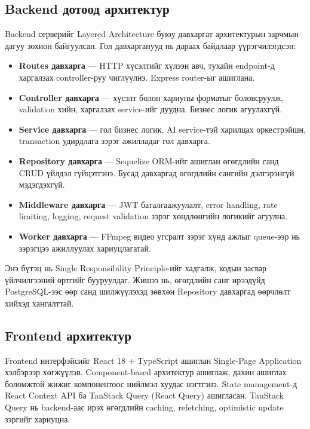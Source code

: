 \subsection{Backend дотоод архитектур}

Backend серверийг Layered Architecture буюу давхаргат архитектурын зарчмын дагуу зохион байгуулсан. Гол давхарганууд нь дараах байдлаар үүрэгчилэгдсэн:

\begin{itemize}
  \item \textbf{Routes давхарга} --- HTTP хүсэлтийг хүлээн авч, тухайн endpoint-д харгалзах controller-руу чиглүүлнэ. Express router-ыг ашиглана.
  \item \textbf{Controller давхарга} --- хүсэлт болон хариуны форматыг боловсруулж, validation хийн, харгалзах service-ийг дуудна. Бизнес логик агуулахгүй.
  \item \textbf{Service давхарга} --- гол бизнес логик, AI service-тэй харилцах оркестрэйшн, transaction удирдлага зэрэг ажилладаг гол давхарга.
  \item \textbf{Repository давхарга} --- Sequelize ORM-ийг ашиглан өгөгдлийн санд CRUD үйлдэл гүйцэтгэнэ. Бусад давхаргад өгөгдлийн сангийн дэлгэрэнгүй мэдэгдэхгүй.
  \item \textbf{Middleware давхарга} --- JWT баталгаажуулалт, error handling, rate limiting, logging, request validation зэрэг хөндлөнгийн логикийг агуулна.
  \item \textbf{Worker давхарга} --- FFmpeg видео угсралт зэрэг хүнд ажлыг queue-ээр нь зэрэгцээ ажиллуулах хариуцлагатай.
\end{itemize}

Энэ бүтэц нь Single Responsibility Principle-ийг хадгалж, кодын засвар үйлчилгээний өртгийг бууруулдаг. Жишээ нь, өгөгдлийн санг ирээдүйд PostgreSQL-ээс өөр санд шилжүүлэхэд зөвхөн Repository давхаргад өөрчлөлт хийхэд хангалттай.

\subsection{Frontend архитектур}

Frontend интерфэйсийг React 18 + TypeScript ашиглан Single-Page Application хэлбэрээр хөгжүүлэв. Component-based архитектур ашиглаж, дахин ашиглах боломжтой жижиг компонентоос нийлмэл хуудас нэгтгэнэ. State management-д React Context API ба TanStack Query (React Query) ашигласан. TanStack Query нь backend-аас ирэх өгөгдлийн caching, refetching, optimistic update зэргийг хариуцна.

